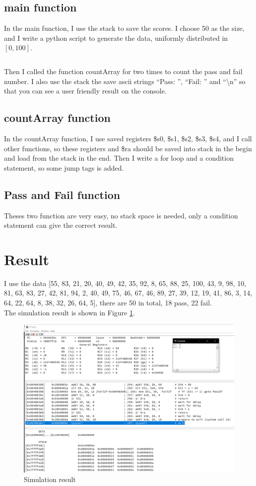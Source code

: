 \documentclass{article}
\begin{document}
\subsection{main function}
In the main function, I use the stack to save the scores. I choose 50 as the size, and I write a python script to generate the data, uniformly distributed in $[0,100]$.
\inputminted{python}{testArray.py}

Then I called the function countArray for two times to count the pass and fail number. I also use the stack the save ascii strings ``Pass: '', ``Fail: '' and ``\textbackslash n'' so that you can see a user friendly result on the console.

\subsection{countArray function}
In the countArray function, I use saved registers \$s0, \$s1, \$s2, \$s3, \$s4, and I call other functions, so these registers and \$ra should be saved into stack in the begin and load from the stack in the end. Then I write a for loop and a condition statement, so some jump tags is added.

\subsection{Pass and Fail function}
Theses two function are very easy, no stack space is needed, only a condition statement can give the correct result.

\section{Result}
I use the data [55, 83, 21, 20, 40, 49, 42, 35, 92, 8, 65, 88, 25, 100, 43, 9, 98, 10, 81, 63, 83, 27, 42, 81, 94, 2, 40, 49, 75, 46, 67, 46, 89, 27, 39, 12, 19, 41, 86, 3, 14, 64, 22, 64, 8, 38, 32, 26, 64, 5], there are 50 in total, 18 pass, 22 fail. \\

The simulation result is shown in Figure \ref{fig-console}.

\begin{figure}[!htbp]
\centering
\includegraphics[width=\linewidth]{console.png}
\caption{Simulation result}
\label{fig-console}
\end{figure}
\end{document}
